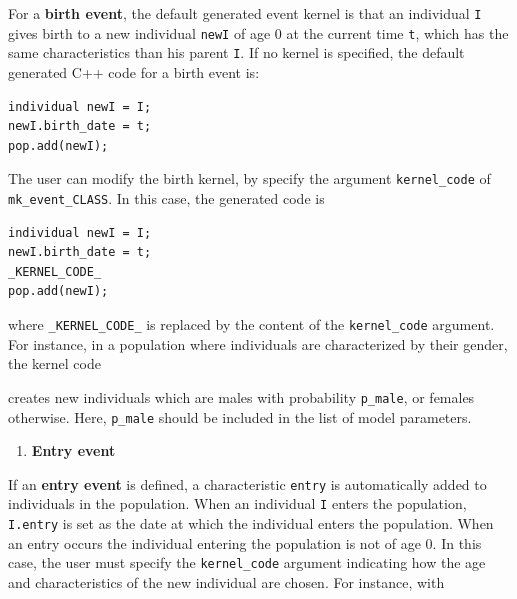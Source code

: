 For a \textbf{birth event}, the default generated event kernel is that an individual \texttt{I} gives birth to a new individual \texttt{newI} of age 0 at the current time \texttt{t}, which has the same characteristics than his parent \texttt{I}. If no kernel is specified, the default generated C++ code for a birth event is:

\begin{verbatim}
individual newI = I;
newI.birth_date = t;
pop.add(newI);
\end{verbatim}

The user can modify the birth kernel, by specify the argument \texttt{kernel\_code} of \texttt{mk\_event\_CLASS}. In this case, the generated code is

\begin{verbatim}
individual newI = I;
newI.birth_date = t;
_KERNEL_CODE_
pop.add(newI);
\end{verbatim}

where \texttt{\_KERNEL\_CODE\_} is replaced by the content of the \texttt{kernel\_code} argument. For instance, in a population where individuals are characterized by their gender, the kernel code

\begin{Shaded}
\begin{Highlighting}[]
\OtherTok{\textless{}{-}} 
\end{Highlighting}
\end{Shaded}

creates new individuals which are males with probability \texttt{p\_male}, or females otherwise. Here, \texttt{p\_male} should be included in the list of model parameters.

\begin{enumerate}
\def\labelenumi{\arabic{enumi}.}
\setcounter{enumi}{3}
\tightlist
\item
  \textbf{Entry event}
\end{enumerate}

If an \textbf{entry event} is defined, a characteristic \texttt{entry} is automatically added to individuals in the population. When an individual \texttt{I} enters the population, \texttt{I.entry} is set as the date at which the individual enters the population.
When an entry occurs the individual entering the population is not of age \(0\). In this case, the user must specify the \texttt{kernel\_code} argument indicating how the age and characteristics of the new individual are chosen. For instance, with

